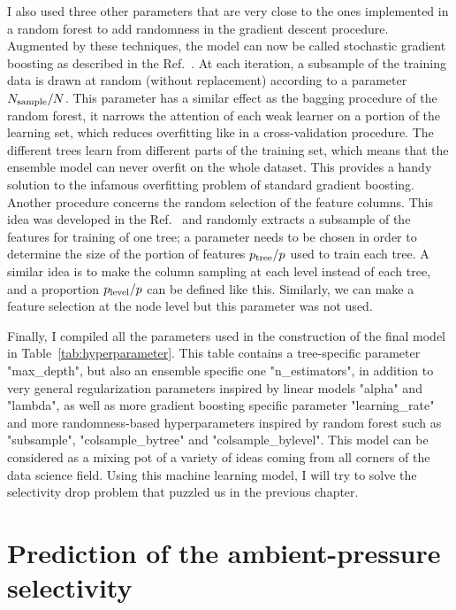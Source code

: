 \documentclass[main]{subfiles}
\begin{document}
I also used three other parameters that are very close to the ones implemented in a random forest to add randomness in the gradient descent procedure. Augmented by these techniques, the model can now be called stochastic gradient boosting as described in the Ref.~\cite{Friedman2002}. At each iteration, a subsample of the training data is drawn at random (without replacement) according to a parameter $N_{\text{sample}}/N$. This parameter has a similar effect as the bagging procedure of the random forest, it narrows the attention of each weak learner on a portion of the learning set, which reduces overfitting like in a cross-validation procedure. The different trees learn from different parts of the training set, which means that the ensemble model can never overfit on the whole dataset. This provides a handy solution to the infamous overfitting problem of standard gradient boosting. Another procedure concerns the random selection of the feature columns. This idea was developed in the Ref.~\cite{Tin_Kam_Ho_1998} and randomly extracts a subsample of the features for training of one tree; a parameter needs to be chosen in order to determine the size of the portion of features $p_{\text{tree}}/p$ used to train each tree. A similar idea is to make the column sampling at each level instead of each tree, and a proportion $p_{\text{level}}/p$ can be defined like this. Similarly, we can make a feature selection at the node level but this parameter was not used. 

Finally, I compiled all the parameters used in the construction of the final model in Table~\ref{tab:hyperparameter}. This table contains a tree-specific parameter "max\_depth", but also an ensemble specific one "n\_estimators", in addition to very general regularization parameters inspired by linear models "alpha" and "lambda", as well as more gradient boosting specific parameter "learning\_rate" and more randomness-based hyperparameters inspired by random forest such as "subsample", "colsample\_bytree" and "colsample\_bylevel". This model can be considered as a mixing pot of a variety of ideas coming from all corners of the data science field. Using this machine learning model, I will try to solve the selectivity drop problem that puzzled us in the previous chapter.

\section{Prediction of the ambient-pressure selectivity}
\end{document}
